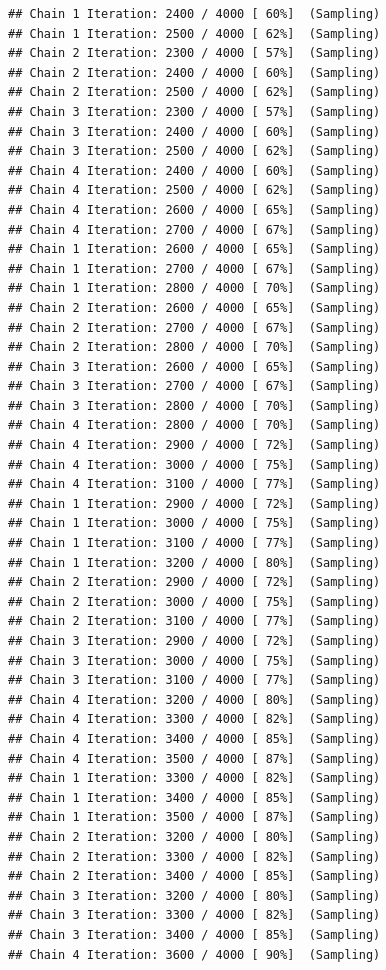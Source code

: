 \documentclass[
]{article}
\begin{document}
\begin{verbatim}
## Chain 1 Iteration: 2400 / 4000 [ 60%]  (Sampling) 
## Chain 1 Iteration: 2500 / 4000 [ 62%]  (Sampling) 
## Chain 2 Iteration: 2300 / 4000 [ 57%]  (Sampling) 
## Chain 2 Iteration: 2400 / 4000 [ 60%]  (Sampling) 
## Chain 2 Iteration: 2500 / 4000 [ 62%]  (Sampling) 
## Chain 3 Iteration: 2300 / 4000 [ 57%]  (Sampling) 
## Chain 3 Iteration: 2400 / 4000 [ 60%]  (Sampling) 
## Chain 3 Iteration: 2500 / 4000 [ 62%]  (Sampling) 
## Chain 4 Iteration: 2400 / 4000 [ 60%]  (Sampling) 
## Chain 4 Iteration: 2500 / 4000 [ 62%]  (Sampling) 
## Chain 4 Iteration: 2600 / 4000 [ 65%]  (Sampling) 
## Chain 4 Iteration: 2700 / 4000 [ 67%]  (Sampling) 
## Chain 1 Iteration: 2600 / 4000 [ 65%]  (Sampling) 
## Chain 1 Iteration: 2700 / 4000 [ 67%]  (Sampling) 
## Chain 1 Iteration: 2800 / 4000 [ 70%]  (Sampling) 
## Chain 2 Iteration: 2600 / 4000 [ 65%]  (Sampling) 
## Chain 2 Iteration: 2700 / 4000 [ 67%]  (Sampling) 
## Chain 2 Iteration: 2800 / 4000 [ 70%]  (Sampling) 
## Chain 3 Iteration: 2600 / 4000 [ 65%]  (Sampling) 
## Chain 3 Iteration: 2700 / 4000 [ 67%]  (Sampling) 
## Chain 3 Iteration: 2800 / 4000 [ 70%]  (Sampling) 
## Chain 4 Iteration: 2800 / 4000 [ 70%]  (Sampling) 
## Chain 4 Iteration: 2900 / 4000 [ 72%]  (Sampling) 
## Chain 4 Iteration: 3000 / 4000 [ 75%]  (Sampling) 
## Chain 4 Iteration: 3100 / 4000 [ 77%]  (Sampling) 
## Chain 1 Iteration: 2900 / 4000 [ 72%]  (Sampling) 
## Chain 1 Iteration: 3000 / 4000 [ 75%]  (Sampling) 
## Chain 1 Iteration: 3100 / 4000 [ 77%]  (Sampling) 
## Chain 1 Iteration: 3200 / 4000 [ 80%]  (Sampling) 
## Chain 2 Iteration: 2900 / 4000 [ 72%]  (Sampling) 
## Chain 2 Iteration: 3000 / 4000 [ 75%]  (Sampling) 
## Chain 2 Iteration: 3100 / 4000 [ 77%]  (Sampling) 
## Chain 3 Iteration: 2900 / 4000 [ 72%]  (Sampling) 
## Chain 3 Iteration: 3000 / 4000 [ 75%]  (Sampling) 
## Chain 3 Iteration: 3100 / 4000 [ 77%]  (Sampling) 
## Chain 4 Iteration: 3200 / 4000 [ 80%]  (Sampling) 
## Chain 4 Iteration: 3300 / 4000 [ 82%]  (Sampling) 
## Chain 4 Iteration: 3400 / 4000 [ 85%]  (Sampling) 
## Chain 4 Iteration: 3500 / 4000 [ 87%]  (Sampling) 
## Chain 1 Iteration: 3300 / 4000 [ 82%]  (Sampling) 
## Chain 1 Iteration: 3400 / 4000 [ 85%]  (Sampling) 
## Chain 1 Iteration: 3500 / 4000 [ 87%]  (Sampling) 
## Chain 2 Iteration: 3200 / 4000 [ 80%]  (Sampling) 
## Chain 2 Iteration: 3300 / 4000 [ 82%]  (Sampling) 
## Chain 2 Iteration: 3400 / 4000 [ 85%]  (Sampling) 
## Chain 3 Iteration: 3200 / 4000 [ 80%]  (Sampling) 
## Chain 3 Iteration: 3300 / 4000 [ 82%]  (Sampling) 
## Chain 3 Iteration: 3400 / 4000 [ 85%]  (Sampling) 
## Chain 4 Iteration: 3600 / 4000 [ 90%]  (Sampling) 

\end{verbatim}
\end{document}

